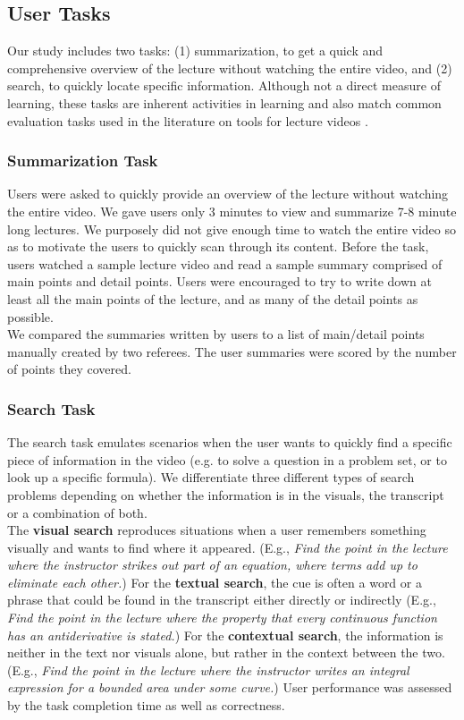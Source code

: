 \subsection {User Tasks}
Our study includes two tasks: (1) summarization, to get a quick and comprehensive overview of the lecture without watching the entire video, and (2) search, to quickly locate specific information.
Although not a direct measure of learning, these tasks are inherent activities in learning and also match common evaluation tasks used in the literature on tools for lecture videos \cite{kim2014data,pavel2014video,monserrat2013notevideo}.\\
%
\subsubsection{Summarization Task}
Users were asked to quickly provide an overview of the lecture without watching the entire video. We gave users only 3 minutes to view and summarize 7-8 minute long lectures. We purposely did not give enough time to watch the entire video so as to motivate the users to quickly scan through its content. Before the task, users watched a sample lecture video and read a sample summary comprised of main points and detail points. Users were encouraged to try to write down at least all the main points of the lecture, and as many of the detail points as possible.\\
%
We compared the summaries written by users to a  list of main/detail points manually created by two referees. The user summaries were scored by the number of points they covered.
%
\subsubsection{Search Task}
The search task emulates scenarios when the user wants to quickly find a specific piece of information in the video (e.g. to solve a question in a problem set, or to look up a specific formula). We differentiate three different types of search problems 
depending on whether the information is in the visuals, the transcript or a combination of both.\\ 

The \textbf{visual search} reproduces situations when a user remembers something visually and wants to find where it appeared. (E.g., \textit{Find the point in the lecture where the instructor strikes out part of an equation, where terms add up to eliminate each other.}) For the \textbf{textual search}, the cue is often a word or a phrase that could be found in the transcript either directly or indirectly (E.g., \textit{Find the point in the lecture where the property that every continuous function has an antiderivative is stated.}) For the \textbf{contextual search}, the information is neither in the text nor visuals alone, but rather in the context between the two. (E.g., \textit{Find the point in the lecture where the instructor writes an integral expression for a bounded area under some curve.}) User performance was assessed by the task completion time as well as correctness.\\

